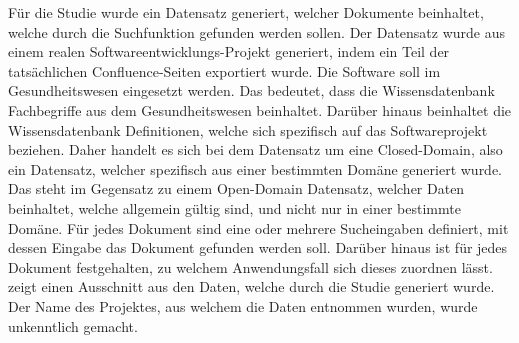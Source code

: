 Für die Studie wurde ein Datensatz generiert, welcher Dokumente beinhaltet, welche durch die Suchfunktion gefunden werden sollen.
Der Datensatz wurde aus einem realen Softwareentwicklungs-Projekt generiert, indem ein Teil der tatsächlichen Confluence-Seiten exportiert wurde.
Die Software soll im Gesundheitswesen eingesetzt werden.
Das bedeutet, dass die Wissensdatenbank Fachbegriffe aus dem Gesundheitswesen beinhaltet.
Darüber hinaus beinhaltet die Wissensdatenbank Definitionen, welche sich spezifisch auf das Softwareprojekt beziehen.
Daher handelt es sich bei dem Datensatz um eine Closed-Domain, also ein Datensatz, welcher spezifisch aus einer bestimmten Domäne generiert wurde.
Das steht im Gegensatz zu einem Open-Domain Datensatz, welcher Daten beinhaltet, welche allgemein gültig sind, und nicht nur in einer bestimmte Domäne.
Für jedes Dokument sind eine oder mehrere Sucheingaben definiert, mit dessen Eingabe das Dokument gefunden werden soll.
Darüber hinaus ist für jedes Dokument festgehalten, zu welchem Anwendungsfall sich dieses zuordnen lässt.
 zeigt einen Ausschnitt aus den Daten, welche durch die Studie generiert wurde.
Der Name des Projektes, aus welchem die Daten entnommen wurden, wurde unkenntlich gemacht.\\

\begin{table}[!ht]
    \centering
\end{table}

\begin{table}[!ht]
    \centering
    \label{ausschnitt-studie-ergebnisse}
    \caption[Ausschnitt der Ergebnisse]{Ausschnitt aus den Ergebnissen der Studie}
\end{table}

